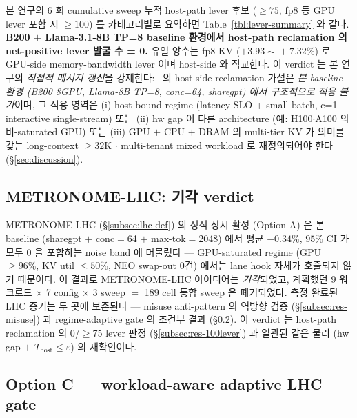 본 연구의 6 회 cumulative sweep 누적 host-path lever 후보 ($\ge\!75$, fp8 등 GPU lever 포함 시 $\ge\!100$)
를 카테고리별로 요약하면 Table~\ref{tbl:lever-summary} 와 같다.
\textbf{B200 $+$ Llama-3.1-8B TP=8 baseline 환경에서 host-path reclamation 의 net-positive lever 발굴 수 = 0.}
유일 양수는 fp8 KV ($+3.93\!\sim\!+7.32\%$) 로 GPU-side memory-bandwidth lever 이며 host-side 와 직교한다.
이 verdict 는 본 연구의 \emph{직접적 메시지 갱신}을 강제한다:
\algname\ 의 host-side reclamation 가설은 \emph{본 baseline 환경 (B200 8GPU, Llama-8B TP=8, conc=64, sharegpt)
에서 구조적으로 적용 불가}이며, 그 적용 영역은 (i) host-bound regime (latency SLO + small batch,
c=1 interactive single-stream) 또는 (ii) hw gap 이 다른 architecture (예: H100$\cdot$A100 의 비-saturated GPU)
또는 (iii) GPU $+$ CPU $+$ DRAM 의 multi-tier KV 가 의미를 갖는 long-context $\ge\!32$K $\cdot$ multi-tenant
mixed workload 로 재정의되어야 한다 (\S\ref{sec:discussion}).

\subsection{METRONOME-LHC: 기각 verdict}
\label{subsec:res-metronome-lhc}

METRONOME-LHC (\S\ref{subsec:lhc-def}) 의 정적 상시-활성 (Option A) 은
본 baseline (sharegpt $+$ conc$=$64 $+$ max-tok$=$2048) 에서 평균
$-0.34\%$, $95\%$ CI 가 모두 $0$ 을 포함하는 noise band 에 머물렀다 ---
GPU-saturated regime (GPU $\ge\!96\%$, KV util $\le\!50\%$, NEO swap-out
0건) 에서는 lane hook 자체가 호출되지 않기 때문이다. 이 결과로
METRONOME-LHC 아이디어는 \emph{기각}되었고, 계획했던 9 워크로드 $\times$
7 config $\times$ 3 sweep $=$ 189 cell 통합 sweep 은 폐기되었다.
측정 완료된 LHC 증거는 두 곳에 보존된다 --- misuse anti-pattern 의
역방향 검증 (\S\ref{subsec:res-misuse}) 과 regime-adaptive gate 의
조건부 결과 (\S\ref{subsec:res-optionC}). 이 verdict 는 host-path
reclamation 의 0/$\ge$75 lever 판정 (\S\ref{subsec:res-100lever}) 과
일관된 같은 물리 (hw gap $+$ $T_{\mathrm{host}}\!\le\!\varepsilon$) 의
재확인이다.

\subsection{Option C — workload-aware adaptive LHC gate}
\label{subsec:res-optionC}

